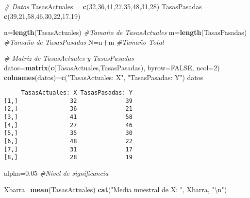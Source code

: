 \documentclass[
  a4paper,
  oneside,
  openany]{book}
\newenvironment{Shaded}{\begin{snugshade}}{\end{snugshade}}
\newcommand{\CharTok}[1]{\textcolor[rgb]{0.31,0.60,0.02}{#1}}
\newcommand{\CommentTok}[1]{\textcolor[rgb]{0.56,0.35,0.01}{\textit{#1}}}
\newcommand{\DataTypeTok}[1]{\textcolor[rgb]{0.13,0.29,0.53}{#1}}
\newcommand{\DecValTok}[1]{\textcolor[rgb]{0.00,0.00,0.81}{#1}}
\newcommand{\FloatTok}[1]{\textcolor[rgb]{0.00,0.00,0.81}{#1}}
\newcommand{\KeywordTok}[1]{\textcolor[rgb]{0.13,0.29,0.53}{\textbf{#1}}}
\newcommand{\NormalTok}[1]{#1}
\newcommand{\OperatorTok}[1]{\textcolor[rgb]{0.81,0.36,0.00}{\textbf{#1}}}
\newcommand{\OtherTok}[1]{\textcolor[rgb]{0.56,0.35,0.01}{#1}}
\newcommand{\StringTok}[1]{\textcolor[rgb]{0.31,0.60,0.02}{#1}}
\begin{document}
\begin{Shaded}
\begin{Highlighting}[]
\CommentTok{\# Datos}
\NormalTok{TasasActuales =}\StringTok{ }\KeywordTok{c}\NormalTok{(}\DecValTok{32}\NormalTok{,}\DecValTok{36}\NormalTok{,}\DecValTok{41}\NormalTok{,}\DecValTok{27}\NormalTok{,}\DecValTok{35}\NormalTok{,}\DecValTok{48}\NormalTok{,}\DecValTok{31}\NormalTok{,}\DecValTok{28}\NormalTok{)}
\NormalTok{TasasPasadas =}\StringTok{ }\KeywordTok{c}\NormalTok{(}\DecValTok{39}\NormalTok{,}\DecValTok{21}\NormalTok{,}\DecValTok{58}\NormalTok{,}\DecValTok{46}\NormalTok{,}\DecValTok{30}\NormalTok{,}\DecValTok{22}\NormalTok{,}\DecValTok{17}\NormalTok{,}\DecValTok{19}\NormalTok{)}

\NormalTok{n=}\KeywordTok{length}\NormalTok{(TasasActuales)  }\CommentTok{\#Tamaño de TasasActuales}
\NormalTok{m=}\KeywordTok{length}\NormalTok{(TasasPasadas)   }\CommentTok{\#Tamaño de TasasPasadas}
\NormalTok{N=n}\OperatorTok{+}\NormalTok{m                    }\CommentTok{\#Tamaño Total}

\CommentTok{\# Matriz de TasasActuales y TasasPasadas}
\NormalTok{datos=}\KeywordTok{matrix}\NormalTok{(}\KeywordTok{c}\NormalTok{(TasasActuales,TasasPasadas), }\DataTypeTok{byrow=}\OtherTok{FALSE}\NormalTok{, }\DataTypeTok{ncol=}\DecValTok{2}\NormalTok{)}
\KeywordTok{colnames}\NormalTok{(datos)=}\KeywordTok{c}\NormalTok{(}\StringTok{"TasasActuales: X"}\NormalTok{, }\StringTok{"TasasPasadas: Y"}\NormalTok{)}
\NormalTok{datos}
\end{Highlighting}
\end{Shaded}

\begin{verbatim}
     TasasActuales: X TasasPasadas: Y
[1,]               32              39
[2,]               36              21
[3,]               41              58
[4,]               27              46
[5,]               35              30
[6,]               48              22
[7,]               31              17
[8,]               28              19
\end{verbatim}

\begin{Shaded}
\begin{Highlighting}[]
\NormalTok{alpha=}\FloatTok{0.05}  \CommentTok{\#Nivel de significancia }

\NormalTok{Xbarra=}\KeywordTok{mean}\NormalTok{(TasasActuales)}
\KeywordTok{cat}\NormalTok{(}\StringTok{"Media muestral de X: "}\NormalTok{, Xbarra, }\StringTok{"}\CharTok{\textbackslash{}n}\StringTok{"}\NormalTok{)}
\end{Highlighting}
\end{Shaded}
\end{document}
